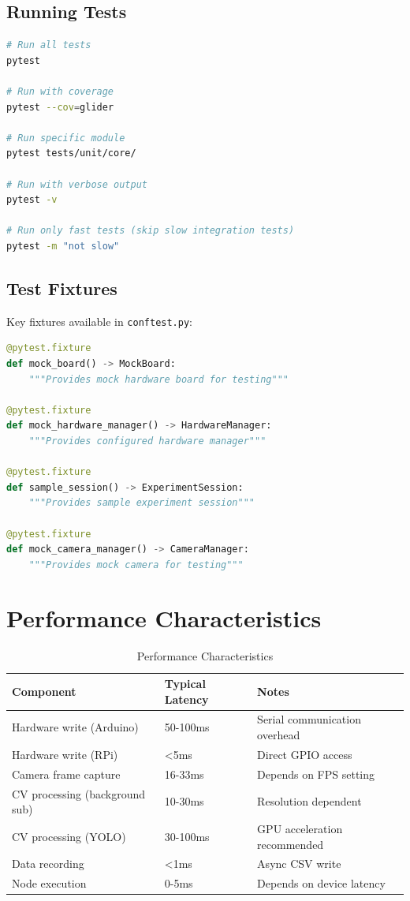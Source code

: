 \documentclass[11pt,a4paper]{article}
\begin{document}
\subsection{Running Tests}

\begin{lstlisting}[language=bash]
# Run all tests
pytest

# Run with coverage
pytest --cov=glider

# Run specific module
pytest tests/unit/core/

# Run with verbose output
pytest -v

# Run only fast tests (skip slow integration tests)
pytest -m "not slow"
\end{lstlisting}

\subsection{Test Fixtures}

Key fixtures available in \texttt{conftest.py}:

\begin{lstlisting}[language=Python]
@pytest.fixture
def mock_board() -> MockBoard:
    """Provides mock hardware board for testing"""

@pytest.fixture
def mock_hardware_manager() -> HardwareManager:
    """Provides configured hardware manager"""

@pytest.fixture
def sample_session() -> ExperimentSession:
    """Provides sample experiment session"""

@pytest.fixture
def mock_camera_manager() -> CameraManager:
    """Provides mock camera for testing"""
\end{lstlisting}

\section{Performance Characteristics}

\begin{table}[H]
\centering
\begin{tabular}{@{}lll@{}}
\toprule
\textbf{Component} & \textbf{Typical Latency} & \textbf{Notes} \\
\midrule
Hardware write (Arduino) & 50-100ms & Serial communication overhead \\
Hardware write (RPi) & <5ms & Direct GPIO access \\
Camera frame capture & 16-33ms & Depends on FPS setting \\
CV processing (background sub) & 10-30ms & Resolution dependent \\
CV processing (YOLO) & 30-100ms & GPU acceleration recommended \\
Data recording & <1ms & Async CSV write \\
Node execution & 0-5ms & Depends on device latency \\
\bottomrule
\end{tabular}
\caption{Performance Characteristics}
\end{table}
\end{document}
